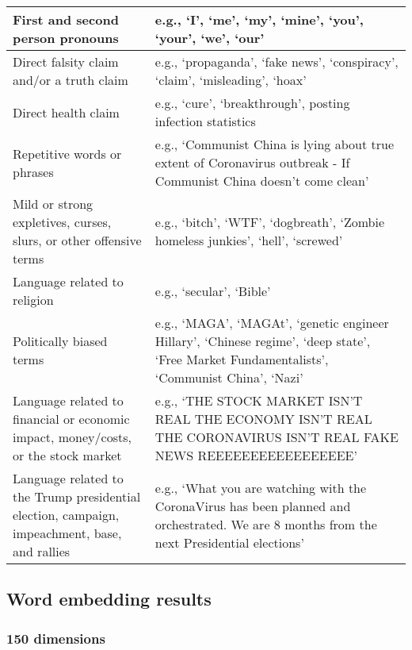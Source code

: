 \documentclass{article}
\begin{document}
\begin{table}[htp]
\begin{tabular}{p{6cm}|p{9cm}}
    \hline
    First and second person pronouns & e.g., ‘I’, ‘me’, ‘my’, ‘mine’, ‘you’, ‘your’, ‘we’, ‘our’ \\
    \hline
    Direct falsity claim and/or a truth claim & e.g., ‘propaganda’, ‘fake news’, ‘conspiracy’, ‘claim’, ‘misleading’, ‘hoax’ \\
    \hline
    Direct health claim & e.g., ‘cure’, ‘breakthrough’, posting infection statistics \\
    \hline
    Repetitive words or phrases & e.g., ‘Communist China is lying about true extent of Coronavirus outbreak - If Communist China doesn’t come clean’ \\
    \hline
    Mild or strong expletives, curses, slurs, or other offensive terms & e.g., ‘bitch’, ‘WTF’, ‘dogbreath’, ‘Zombie homeless junkies’, ‘hell’, ‘screwed’ \\
    \hline
    Language related to religion & e.g., ‘secular’, ‘Bible’ \\
     \hline
    Politically biased terms & e.g., ‘MAGA’, ‘MAGAt’, ‘genetic engineer Hillary’, ‘Chinese regime’, ‘deep state’, ‘Free Market Fundamentalists’, ‘Communist China’, ‘Nazi’ \\
    \hline
    Language related to financial or economic impact, money/costs, or the stock market & e.g., ‘THE STOCK MARKET ISN’T REAL THE ECONOMY ISN’T REAL THE CORONAVIRUS ISN’T REAL FAKE NEWS REEEEEEEEEEEEEEEEE’ \\
    \hline
    Language related to the Trump presidential election, campaign, impeachment, base, and rallies & e.g., ‘What you are watching with the CoronaVirus has been planned and orchestrated. We are 8 months from the next Presidential elections’ \\
    \hline
  \end{tabular}
  \label{tab:table1words}
\end{table}

\hypertarget{word-embedding-results}{%
\subsection{Word embedding results}\label{word-embedding-results}}

\hypertarget{dimensions}{%
\subsubsection{150 dimensions}\label{dimensions}}
\end{document}
